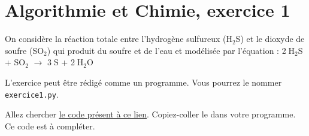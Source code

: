 \documentclass[11pt]{article}
\begin{document}





\newpage

\section{Algorithmie et Chimie, exercice 1}





\bigskip


On considère la réaction totale entre l’hydrogène sulfureux (H$_2$S) et le dioxyde de soufre (SO$_2$) qui  produit du soufre et de l’eau et modélisée par l'équation : 
2$\;$H$_2$S  + SO$_2$ $\longrightarrow$ 3$\;$S + 2$\;$H$_2$O


\medskip
L'exercice peut être rédigé comme un programme. Vous pourrez le nommer \texttt{exercice1.py}. 

\medskip

Allez chercher \href{https://github.com/formationPythonPC-Juin/aides-formation/blob/master/exercice1-aide.py}{\underline{le code présent à ce lien}}. Copiez-coller le dans votre programme. Ce code est à compléter.
\end{document}
